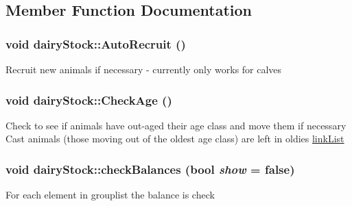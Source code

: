 \subsection{Member Function Documentation}
\hypertarget{classdairy_stock_a86008d68d20074f0261eec2e8e2ed9a0}{
\subsubsection[{AutoRecruit}]{\setlength{\rightskip}{0pt plus 5cm}void dairyStock::AutoRecruit ()}}
\label{classdairy_stock_a86008d68d20074f0261eec2e8e2ed9a0}
Recruit new animals if necessary -\/ currently only works for calves \hypertarget{classdairy_stock_a0de0c3cb5055c9eeeb9d30a039ec0774}{
\subsubsection[{CheckAge}]{\setlength{\rightskip}{0pt plus 5cm}void dairyStock::CheckAge ()}}
\label{classdairy_stock_a0de0c3cb5055c9eeeb9d30a039ec0774}
Check to see if animals have out-\/aged their age class and move them if necessary Cast animals (those moving out of the oldest age class) are left in oldies \hyperlink{classlink_list}{linkList} \hypertarget{classdairy_stock_a5bc23504c268f65736035b37b94af54a}{
\subsubsection[{checkBalances}]{\setlength{\rightskip}{0pt plus 5cm}void dairyStock::checkBalances (bool {\em show} = {\ttfamily false})}}
\label{classdairy_stock_a5bc23504c268f65736035b37b94af54a}
For each element in grouplist the balance is check 

